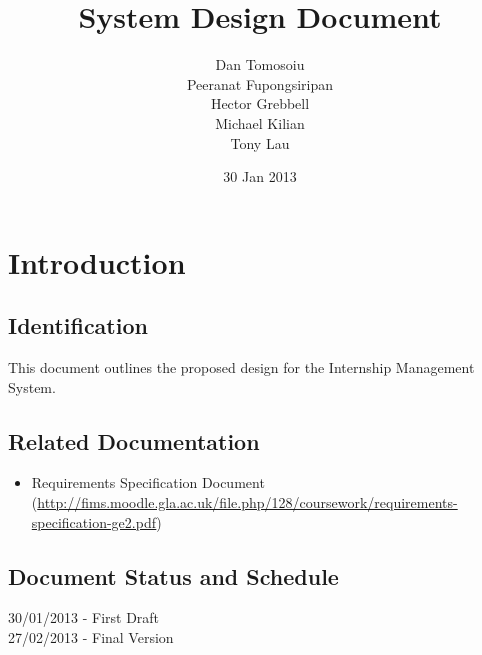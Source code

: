\documentclass{l3deliverable}
\title{System Design Document}
\author{
  Dan Tomosoiu \\
  Peeranat Fupongsiripan \\
  Hector Grebbell \\
  Michael Kilian \\
  Tony Lau \\
}
\date{30 Jan 2013}
\begin{document}

\maketitle


\section{Introduction}

\subsection{Identification}
This document outlines the proposed design for the Internship Management System. 
\subsection{Related Documentation}
\begin{itemize}
\item{Requirements Specification Document (\url{http://fims.moodle.gla.ac.uk/file.php/128/coursework/requirements-specification-ge2.pdf})}
\end{itemize}
 

\subsection{Document Status and Schedule}
30/01/2013 - First Draft\\
27/02/2013 - Final Version
\end{document}

